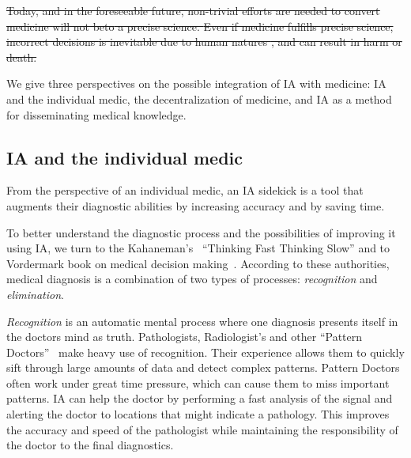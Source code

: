 \documentclass[11pt]{pnas-new}
\begin{document}


\sout{
Today, and in the foreseeable
future, \sout {\color{blue}non-trivial efforts are needed to convert} medicine \sout{will not be}{\color{blue}to} a precise science. {\color{blue}Even if medicine fulfills precise science,} incorrect decisions {\color{blue}is inevitable due to human natures \cite{donaldson2000err}, and }
can result in harm or death.  }

We give three perspectives on the possible integration of IA with
medicine: IA and the individual medic, the decentralization of
medicine, and IA as a method for disseminating medical knowledge.

\subsection{IA and the individual medic}

 
From the perspective of an individual medic, an IA sidekick is a
tool that augments their diagnostic abilities by increasing accuracy
and by saving time.

To better understand the diagnostic process and the possibilities  of
improving it using IA, we turn to the Kahaneman's~\cite{kahneman2011thinking}
``Thinking Fast Thinking Slow'' and to Vordermark book on medical
decision making~\cite{vordermark2019introduction}. According to these authorities,
medical diagnosis is a combination of two types of processes: {\em
  recognition} and {\em elimination}.

{\em Recognition} is an automatic mental process where one diagnosis
presents itself in the doctors mind as truth. Pathologists,
Radiologist's and other ``Pattern Doctors''~\cite{topol2019deep} make heavy use
of recognition. Their experience allows them to quickly sift through
large amounts of data and detect complex patterns. Pattern Doctors
often work under great time pressure, which can cause them to miss
important patterns. IA can help the doctor by performing a fast
analysis of the signal and alerting the doctor to locations that might
indicate a pathology. This improves the accuracy and speed of the
pathologist while maintaining the responsibility of the doctor to the
final diagnostics. 
\end{document}
